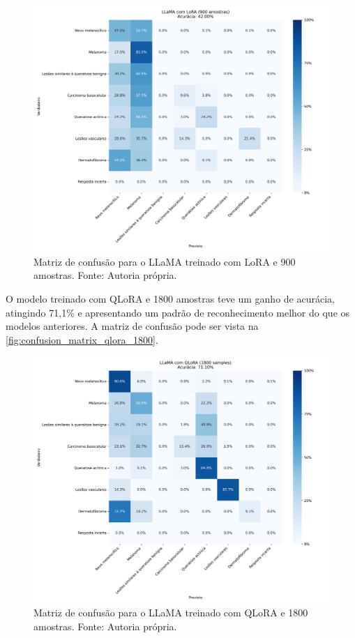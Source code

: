 \begin{figure}[ht]
    \centering
    \includegraphics[width=1\columnwidth,keepaspectratio]{images/confusion_matrix_lora_900.png}
    \caption{\small Matriz de confusão para o \ac{LLaMA} treinado com \ac{LoRA} e 900 amostras. Fonte: Autoria
        própria.}
    \label{fig:confusion_matrix_lora_900}
\end{figure}


O modelo treinado com \ac{QLoRA} e 1800 amostras teve um ganho de acurácia, atingindo 71,1\% e apresentando um padrão de reconhecimento melhor do que os modelos
anteriores. A matriz de confusão pode ser vista na \autoref{fig:confusion_matrix_qlora_1800}.

\clearpage

\begin{figure}[ht]
    \centering
    \includegraphics[width=1\columnwidth,keepaspectratio]{images/confusion_matrix_qlora_1800.png}
    \caption{\small Matriz de confusão para o \ac{LLaMA} treinado com \ac{QLoRA} e 1800 amostras. Fonte: Autoria
        própria.}
    \label{fig:confusion_matrix_qlora_1800}
\end{figure}

